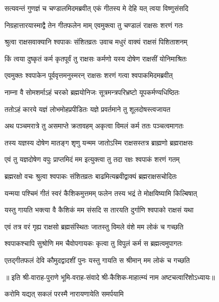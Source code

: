 \twolineshloka
{सत्यवन्तं गुणज्ञं च चण्डालमिदमब्रवीत्}
{एकं गीतस्य मे देहि यत् त्वया विष्णुसंसदि}%

\twolineshloka
{निग्रहात्तारयास्माद्वै तेन गीतफलेन माम्}
{एवमुक्त्वा तु चण्डालं राक्षसः शरणं गतः}%

\twolineshloka
{श्रुत्वा राक्षसवाक्यानि श्वपाकः संशितव्रतः}
{उवाच मधुरं वाक्यं राक्षसं पिशिताशनम्}%

\twolineshloka
{किं त्वया दुष्कृतं कर्म कृतपूर्वं तु राक्षसः}
{कर्मणो यस्य दोषेण राक्षसीं योनिमाश्रितः}%

\twolineshloka
{एवमुक्तः श्वपाकेन पूर्ववृत्तमनुस्मरन्}
{राक्षसः शरणं गत्वा श्वपाकमिदमब्रवीत्}%

\twolineshloka
{नाम्ना वै सोमशर्माऽहं चरको ब्रह्मयोनिजः}
{सूत्रमन्त्रपरिभ्रष्टो यूपकर्मण्यधिष्ठितः}%

\twolineshloka
{ततोऽहं कारये यज्ञं लोभमोहप्रपीडितः}
{यज्ञे प्रवर्तमाने तु शूलदोषस्त्वजायत}%

\twolineshloka
{अथ पञ्चमरात्रे तु असमाप्ते क्रतावहम्}
{अकृत्वा विमलं कर्म ततः पञ्चत्वमागतः}%

\twolineshloka
{तस्य यज्ञस्य दोषेण मातङ्ग शृणु यन्मम}
{जातोऽस्मि राक्षसस्तत्र ब्राह्मणो ब्रह्मराक्षसः}%

\twolineshloka
{एवं तु यज्ञदोषेण वपुः प्राप्तमिदं मम}
{इत्युक्त्वा तु तदा रक्षः श्वपाकं शरणं गतम्}%

\twolineshloka
{ब्रह्मरक्षो वचः श्रुत्वा श्वपाकः संशितव्रतः}
{बाढमित्यब्रवीद्वाक्यं ब्रह्मराक्षसचोदितः}%

\twolineshloka
{यन्मया पश्चिमं गीतं स्वरं कैशिकमुत्तमम्}
{फलेन तस्य भद्रं ते मोक्षयिष्यामि किल्बिषात्}%


\twolineshloka
{यस्तु गायति भक्त्या वै कैशिकं मम संसदि}
{स तारयति दुर्गाणि श्वपाको राक्षसं यथा}%

\twolineshloka
{एवं तत्र वरं गृह्य राक्षसो ब्रह्मसंस्थितः}
{जातस्तु विमले वंशे मम लोकं च गच्छति}%

\twolineshloka
{श्वपाकश्चापि सुश्रोणि मम चैवोपगायकः}
{कृत्वा तु विपुलं कर्म स ब्रह्मत्वमुपागतः}%

\twolineshloka
{एतद्गीतफलं देवि कौमुदद्वादशीं पुनः}
{यस्तु गायति स श्रीमान् मम लोकं च गच्छति}%

॥ इति श्री-वाराह-पुराणे भूमि-वराह-संवादे श्री-कैशिक-माहात्म्यं नाम अष्टचत्वारिंशोऽध्यायः॥

{करोमि यद्यत् सकलं परस्मै नारायणायेति समर्पयामि}
